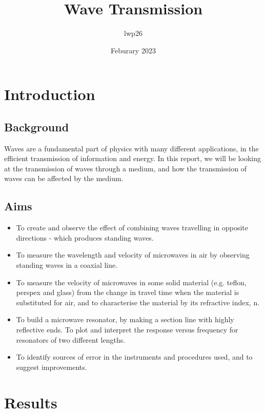 \documentclass[12pt]{article}
\begin{document}
\title{Wave Transmission}
\author{lwp26}
\date{Feburary 2023}
\maketitle


\section{Introduction}

\subsection{Background}

Waves are a fundamental part of physics with many different applications,
in the efficient transmission of information and energy. 
In this report, we will be looking at the transmission of waves through a medium, 
and how the transmission of waves can be affected by the medium.


\subsection{Aims}
\begin{itemize}
    \item To create and observe the effect of combining waves travelling in opposite directions - 
    which produces standing waves.
    \item To measure the wavelength and velocity of microwaves in air by observing standing waves
    in a coaxial line.
    \item To measure the velocity of microwaves in some solid material (e.g. teflon, perspex and
    glass) from the change in travel time when the material is substituted for air, and to
    characterise the material by its refractive index, n.
    \item To build a microwave resonator, by making a section line with highly reflective ends. To
    plot and interpret the response versus frequency for resonators of two different lengths.
    \item To identify sources of error in the instruments and procedures used, and to suggest
    improvements.
\end{itemize}

\section{Results}
\end{document}
